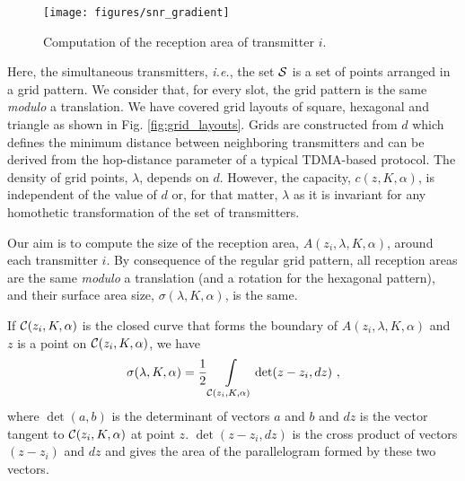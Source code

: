 \documentclass[12pt,english]{article}
\begin{document}
\begin{figure}[!t]
\centering
{}
\texttt{[image: figures/snr\_gradient]}
\caption{Computation of the reception area of transmitter $i$.\label{fig:snr_gradient}}
\end{figure}

Here, the simultaneous transmitters, {\it i.e.}, the set ${\cal S}$ is a set of points arranged in a grid pattern. We consider that, for every slot, the grid pattern is the same {\em modulo} a translation. We have covered grid layouts of square, hexagonal and triangle as shown in Fig. \ref{fig:grid_layouts}. Grids are constructed from $d$ which defines the minimum distance between neighboring transmitters and can be derived from the hop-distance parameter of a typical TDMA-based protocol. The density of grid points, $\lambda$, depends on $d$. However, the capacity, $c(z,K,\alpha)$, is independent of the value of $d$ or, for that matter, $\lambda$ as it is invariant for any homothetic transformation of the set of transmitters. 

Our aim is to compute the size of the reception area, $A(z_i,\lambda,K,\alpha)$, around each transmitter $i$. By consequence of the regular grid pattern, all reception areas are the same {\em modulo} a translation (and a rotation for the hexagonal pattern), and their surface area size, $\sigma(\lambda,K,\alpha)$, is the same.  

If ${\cal C}(z_i,K,\alpha)$ is the closed curve that forms the boundary of $A(z_i,\lambda,K,\alpha)$ and $z$ is a point on ${\cal C}(z_i,K,\alpha)$, we have
\begin{equation}
\sigma(\lambda, K,\alpha)=\frac{1}{2}\displaystyle\int\limits_{{\cal C}(z_i,K,\alpha)}\det(z-z_{i},dz)~,
\label{eq:area_integral}
\end{equation}
where $\det(a,b)$ is the determinant of vectors $a$ and $b$ and $dz$ is the vector tangent to ${\cal C}(z_i,K,\alpha)$ at point $z$. \mbox{$\det(z-z_i,dz)$} is the cross product of vectors $(z-z_{i})$ and $dz$ and gives the area of the parallelogram formed by these two vectors. 
\end{document}
